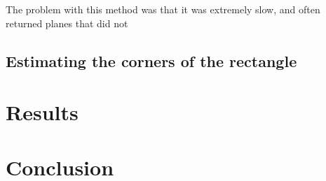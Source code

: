 \documentclass[11pt]{article}
\begin{document}
The problem with this method was that it was extremely slow, and often returned planes that did not 

\subsection{Estimating the corners of the rectangle}

\section{Results}


\section{Conclusion}
\end{document}
